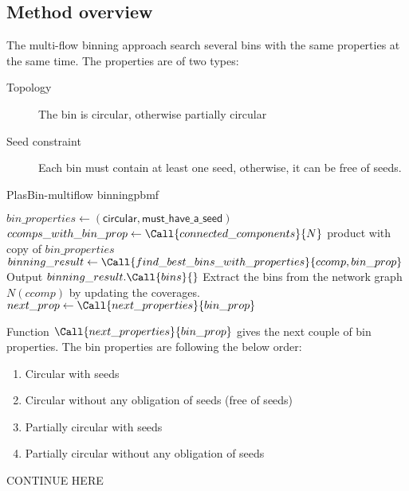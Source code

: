 \subsection{Method overview}

The multi-flow binning approach search several bins with the same properties at the same time.
The properties are of two types:
\begin{description}
  \item[Topology] The bin is circular, otherwise partially circular
  \item[Seed constraint] Each bin must contain at least one seed, otherwise, it can be free of seeds.
\end{description}

\begin{tcbalgo}{PlasBin-multiflow binning}{pbmf}
  \begin{algorithmic}[1]
    \State{} \( bin\_properties \gets (\mathsf{circular}, \mathsf{must\_have\_a\_seed}) \)
    \State{} \( ccomps\_with\_bin\_prop \gets \Call{connected\_components}{ N } \) product with copy of \( bin\_properties \)
    \State{} \( binning\_result \gets \Call{find\_best\_bins\_with\_properties}{ ccomp, bin\_prop } \)
    \State{} Output \( binning\_result.\Call{bins}{ } \)
    \State{} Extract the bins from the network graph \(N(ccomp)\) by updating the coverages.
    \State{} \( next\_prop \gets \Call{next\_properties}{ bin\_prop } \)
    \EndIf{}
    \EndIf{}
    \EndFor{}
    \EndFunction{}
  \end{algorithmic}
\end{tcbalgo}

Function \(\Call{next\_properties}{ bin\_prop }\) gives the next couple of bin properties.
The bin properties are following the below order:
\begin{enumerate}
  \item Circular with seeds
  \item Circular without any obligation of seeds (free of seeds)
  \item Partially circular with seeds
  \item Partially circular without any obligation of seeds
\end{enumerate}

\begin{todobox}
  CONTINUE HERE
\end{todobox}